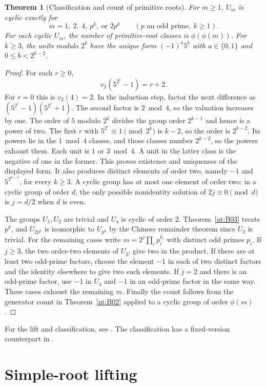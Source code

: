 \documentclass[11pt,oneside,openany]{book}
\theoremstyle{plain}
\newtheorem{theorem}{Theorem}[chapter]
\theoremstyle{definition}
\theoremstyle{remark}
\begin{document}
\begin{theorem}[Classification and count of primitive roots]\label{nt:B04}
For $m\ge1$, $U_m$ is cyclic exactly for
\[
 m=1,\ 2,\ 4,\ p^k,\ \text{or }2p^k
 \qquad(p\text{ an odd prime},\ k\ge1).
\]
For each cyclic $U_m$, the number of primitive-root classes is
$\phi(\phi(m))$. For $k\ge3$, the units modulo $2^k$ have the
unique form $(-1)^a5^b$ with $a\in\{0,1\}$ and
$0\le b<2^{k-2}$.
\end{theorem}
\begin{proof}
For each $r\ge0$,
\[
 v_2\!\left(5^{2^r}-1\right)=r+2.
\]
For $r=0$ this is $v_2(4)=2$. In the induction step,
factor the next difference as
$(5^{2^r}-1)(5^{2^r}+1)$. The second factor is $2\bmod4$,
so the valuation increases by one. The order of $5$ modulo
$2^k$ divides the group order $2^{k-1}$ and hence is a power
of two. The first $r$ with $5^{2^r}\equiv1\pmod{2^k}$ is
$k-2$, so the order is $2^{k-2}$. Its powers lie in the
$1\bmod4$ classes, and those classes number $2^{k-2}$, so
the powers exhaust them. Each unit is $1$ or $3\bmod4$.
A unit in the latter class is the negative of one in the former.
This proves existence and uniqueness of the displayed form.
It also produces distinct elements of order two, namely $-1$
and $5^{2^{k-3}}$, for every $k\ge3$. A cyclic group has
at most one element of order two: in a cyclic group of
order $d$, the only possible nonidentity solution of
$2j\equiv0\pmod d$ is $j=d/2$ when $d$ is even.

The groups $U_1,U_2$ are trivial and $U_4$ is cyclic of order $2$.
Theorem~\ref{nt:B03} treats $p^k$, and $U_{2p^k}$ is
isomorphic to $U_{p^k}$ by the Chinese remainder theorem since
$U_2$ is trivial. For the remaining cases write
$m=2^j\prod_i p_i^{k_i}$ with distinct odd primes $p_i$.
If $j\ge3$, the two order-two elements of $U_{2^j}$ give
two in the product. If there are at least two odd-prime
factors, choose the element $-1$ in each of two distinct
factors and the identity elsewhere to give two such elements.
If $j=2$ and there is an odd-prime factor, use $-1$ in $U_4$
and $-1$ in an odd-prime factor in the same way. These cases
exhaust the remaining $m$. Finally the count follows from
the generator count in Theorem~\ref{nt:B02} applied to a
cyclic group of order $\phi(m)$.
\end{proof}
For the lift and classification, see
\cite[\S\S10.1--10.9 and Thm.~10.11]{apostol}. The classification
has a fixed-version counterpart in \cite[UnitsCyclic]{mathlib}.

\section{Simple-root lifting}
\end{document}
